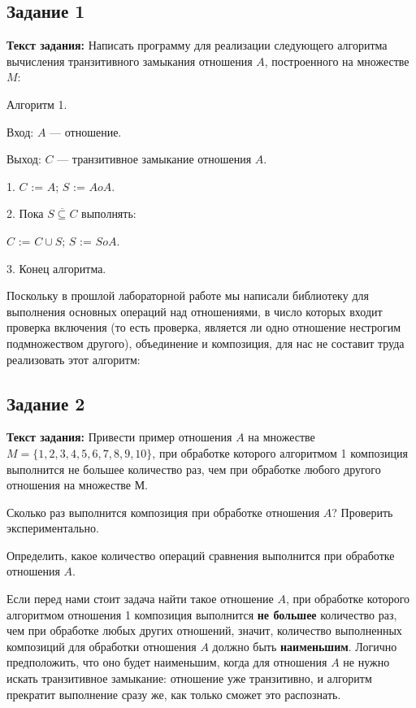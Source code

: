 \documentclass[12pt]{article}
\begin{document}
	 
	 
	
	\newpage
	
	\subsection{Задание 1}
	\label{task1}
	{\bf Текст задания:} Написать программу для реализации следующего алгоритма вычисления транзитивного замыкания отношения $A$, построенного на множестве $M$:
	
	{\parskip=0.05cm
	Алгоритм 1.
	
	Вход: $A$ — отношение.
	
	Выход: $C$ — транзитивное замыкание отношения $A$.
	
	1. $C$ := $A$; $S$ := $A o A$.
	
	2. Пока $\overline{S \subseteq C}$ выполнять:
	
	{\hangindent=2cm  \noindent
	$C$ := $C \cup S$; $S$ := $S o A$.
	
	3. Конец алгоритма.
	}
	}
	
	Поскольку в прошлой лабораторной работе мы написали библиотеку для выполнения основных операций над отношениями, в число которых входит проверка включения (то есть проверка, является ли одно отношение нестрогим подмножеством другого), объединение и композиция, для нас не составит труда реализовать этот алгоритм:
	
	 
	
	\subsection{Задание 2}
	\label{task2}
	{\bf Текст задания:} Привести пример отношения $A$ на множестве $M = \{1, 2, 3, 4, 5, 6, 7, 8, 9, 10\}$, при обработке которого алгоритмом 1 композиция выполнится не большее количество раз, чем при обработке любого другого отношения на множестве М.
	
	Сколько раз выполнится композиция при обработке отношения $A$? Проверить экспериментально.
	
	Определить, какое количество операций сравнения выполнится при обработке отношения $A$.
	
	Если перед нами стоит задача найти такое отношение $A$, при обработке которого алгоритмом отношения 1 композиция выполнится {\bf не большее} количество раз, чем при обработке любых других отношений, значит, количество выполненных композиций для обработки отношения $A$ должно быть {\bf наименьшим}. Логично предположить, что оно будет наименьшим, когда для отношения $A$ не нужно искать транзитивное замыкание: отношение уже транзитивно, и алгоритм прекратит выполнение сразу же, как только сможет это распознать. 
	
\end{document}

